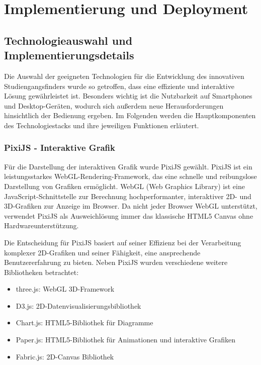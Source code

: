 \section{Implementierung und Deployment}\label{sec:implementierung-und-deployment}
\subsection{Technologieauswahl und Implementierungsdetails}
Die Auswahl der geeigneten Technologien für die Entwicklung des innovativen Studiengangsfinders wurde so getroffen, dass eine effiziente und interaktive Lösung gewährleistet ist. Besonders wichtig ist die Nutzbarkeit auf Smartphones und Desktop-Geräten, wodurch sich außerdem neue Herausforderungen hinsichtlich der Bedienung ergeben. Im Folgenden werden die Hauptkomponenten des Technologiestacks und ihre jeweiligen Funktionen erläutert.

\subsubsection{PixiJS - Interaktive Grafik}
Für die Darstellung der interaktiven Grafik wurde PixiJS gewählt. PixiJS ist ein leistungsstarkes WebGL-Rendering-Framework, das eine schnelle und reibungslose Darstellung von Grafiken ermöglicht. \parencite{pixijs_pixijs_2023} WebGL (Web Graphics Library) ist eine JavaScript-Schnittstelle zur Berechnung hochperformanter, interaktiver 2D- und 3D-Grafiken zur Anzeige im Browser. \parencite{mozilla_corporation_webgl_2023} Da nicht jeder Browser WebGL unterstützt, verwendet PixiJS als Ausweichlösung immer das klassische HTML5 Canvas ohne Hardwareunterstützung. \parencite{pixijs_pixijs_2024}

Die Entscheidung für PixiJS basiert auf seiner Effizienz bei der Verarbeitung komplexer 2D-Grafiken und seiner Fähigkeit, eine ansprechende Benutzererfahrung zu bieten. Neben PixiJS wurden verschiedene weitere Bibliotheken betrachtet:
\begin{itemize}
    \item three.js: WebGL 3D-Framework
    \item D3.js: 2D-Datenvisualisierungsbibliothek
    \item Chart.js: HTML5-Bibliothek für Diagramme
    \item Paper.js: HTML5-Bibliothek für Animationen und interaktive Grafiken
    \item Fabric.js: 2D-Canvas Bibliothek
\end{itemize}

